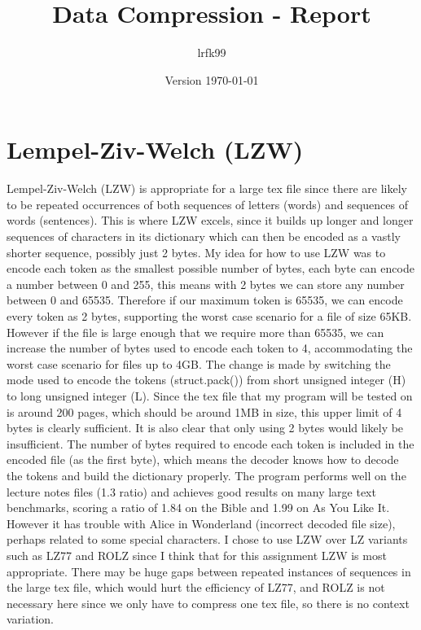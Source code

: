 \documentclass[a4paper, 11pt]{article}
\title{Data Compression - Report}
\date{Version \today}
\author{lrfk99}
\numberwithin{equation}{section}
\theoremstyle{plain}
\theoremstyle{definition}
\begin{document}
\maketitle


\section{Lempel-Ziv-Welch (LZW)}

Lempel-Ziv-Welch (LZW) is appropriate for a large tex file since there are likely to be repeated occurrences 
of both sequences of letters (words) and sequences of words (sentences). 
This is where LZW excels, since it builds up longer and longer sequences of characters in its dictionary 
which can then be encoded as a vastly shorter sequence, possibly just 2 bytes. 
My idea for how to use LZW was to encode each token as the smallest possible number of bytes, 
each byte can encode a number between 0 and 255, this means with 2 bytes we can store any number between 
0 and 65535. 
Therefore if our maximum token is 65535, we can encode every token as 2 bytes, supporting the worst case 
scenario for a file of size 65KB. 
However if the file is large enough that we require more than 65535, we can increase the number of bytes 
used to encode each token to 4, accommodating the worst case scenario for files up to 4GB. 
The change is made by switching the mode used to encode the tokens (struct.pack()) from short unsigned integer (H)
to long unsigned integer (L). 
Since the tex file that my program will be tested on is around 200 pages, which should be around 1MB in size, 
this upper limit of 4 bytes is clearly sufficient. 
It is also clear that only using 2 bytes would likely be insufficient. 
The number of bytes required to encode each token is included in the encoded file (as the first byte), 
which means the decoder knows how to decode the tokens and build the dictionary properly. 
The program performs well on the lecture notes files (1.3 ratio) and achieves good results on many large 
text benchmarks, scoring a ratio of 1.84 on the Bible and 1.99 on As You Like It. 
However it has trouble with Alice in Wonderland (incorrect decoded file size), perhaps related to some 
special characters. 
I chose to use LZW over LZ variants such as LZ77 and ROLZ since I think that for this assignment 
LZW is most appropriate. 
There may be huge gaps between repeated instances of sequences in the large tex file, which would hurt 
the efficiency of LZ77, and ROLZ is not necessary here since we only have to compress one tex file, 
so there is no context variation. 
\end{document}
